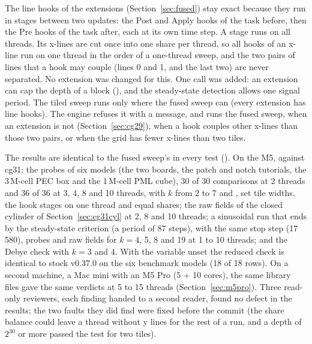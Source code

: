 The line hooks of the extensions (Section~\ref{sec:fused}) stay exact because they run in stages between two updates:
the Post and Apply hooks of the task before, then the Pre hooks of the task after, each at its own time step. A stage
runs on all threads. Its x-lines are cut once into one share per thread, so all hooks of an x-line run on one thread
in the order of a one-thread sweep, and the two pairs of lines that a hook may couple (lines 0 and 1, and the last
two) are never separated. No extension was changed for this. One call was added: an extension can cap the depth of a
block (), and the steady-state detection allows one signal period. The tiled sweep runs
only where the fused sweep can (every extension has line hooks). The engine refuses it with a message, and runs the
fused sweep, when an extension is not  (Section~\ref{sec:cg29}), when a hook couples other x-lines
than those two pairs, or when the grid has fewer x-lines than two tiles.

The results are identical to the fused sweep's in every test (). On the M5,
against cg31: the probes of six models (the two boards, the patch and notch tutorials, the 3\,M-cell PEC box and the
1\,M-cell PML cube), 30 of 30 comparisons at 2 threads and 36 of 36 at 3, 4, 8 and 10 threads, with $k$ from 2 to 7
and , set tile widths, the hook stages on one thread and equal shares; the raw fields of the closed
cylinder of Section~\ref{sec:cg31cyl} at 2, 8 and 10 threads; a sinusoidal run that ends by the steady-state
criterion (a period of 87 steps), with the same stop step (17\,580), probes and raw fields for $k=4$, 5, 8 and 19 at
1 to 10 threads; and the Debye check with $k=3$ and 4. With the variable unset the reduced check is identical to stock
v0.37.0 on the six benchmark models (18 of 18 rows). On a second machine, a Mac mini with an M5 Pro (5 + 10 cores),
the same library files gave the same verdicts at 5 to 15 threads (Section~\ref{sec:m5pro}). Three read-only reviewers, each finding handed to a
second reader, found no defect in the results; the two faults they did find were fixed before the commit (the share
balance could leave a thread without y lines for the rest of a run, and a depth of $2^{30}$ or more passed the test
for two tiles).

